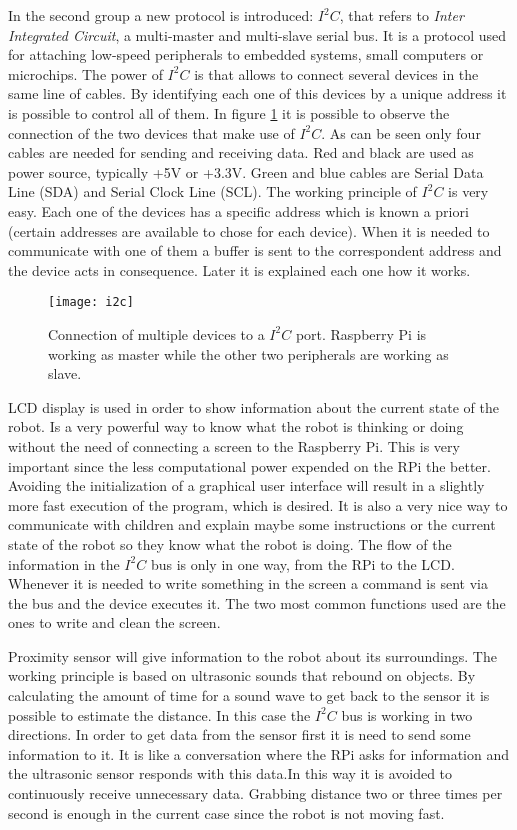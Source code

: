 In the second group a new protocol is introduced: $I^{2}C$, that refers to \textit{Inter Integrated Circuit}, a multi-master and multi-slave serial bus. It is a protocol used for attaching low-speed peripherals to embedded systems, small computers or microchips. The power of $I^{2}C$ is that allows to connect several devices in the same line of cables. By identifying each one of this devices by a unique address it is possible to control all of them. In figure \ref{fig:i2c} it is possible to observe the connection of the two devices that make use of $I^{2}C$. As can be seen only four cables are needed for sending and receiving data. Red and black are used as power source, typically +5V or +3.3V. Green and blue cables are Serial Data Line (SDA) and Serial Clock Line (SCL). The working principle of $I^{2}C$ is very easy. Each one of the devices has a specific address which is known a priori (certain addresses are available to chose for each device). When it is needed to communicate with one of them a buffer is sent to the correspondent address and the device acts in consequence. Later it is explained each one how it works.

\begin{figure}[h]
\centering
\texttt{[image: i2c]}
\caption{Connection of multiple devices to a $I^{2}C$ port. Raspberry Pi is working as master while the other two peripherals are working as slave.}
\label{fig:i2c}
\end{figure}


LCD display is used in order to show information about the current state of the robot. Is a very powerful way to know what the robot is thinking or doing without the need of connecting a screen to the Raspberry Pi. This is very important since the less computational power expended on the RPi the better. Avoiding the initialization of a graphical user interface will result in a slightly more fast execution of the program, which is desired. It is also a very nice way to communicate with children and explain maybe some instructions or the current state of the robot so they know what the robot is doing. The flow of the information in the $I^{2}C$ bus is only in one way, from the RPi to the LCD. Whenever it is needed to write something in the screen a command is sent via the bus and the device executes it. The two most common functions used are the ones to write and clean the screen.

Proximity sensor will give information to the robot about its surroundings. The working principle is based on ultrasonic sounds that rebound on objects. By calculating the amount of time for a sound wave to get back to the sensor it is possible to estimate the distance. In this case the $I^{2}C$ bus is working in two directions. In order to get data from the sensor first it is need to send some information to it. It is like a conversation where the RPi asks for information and the ultrasonic sensor responds with this data.In this way it is avoided to continuously receive unnecessary data. Grabbing distance two or three times per second is enough in the current case since the robot is not moving fast.
